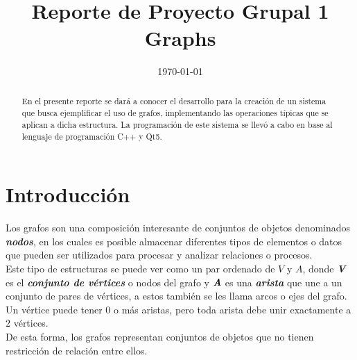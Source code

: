 \documentclass[conference]{IEEEtran}
\date{\specialdate\today}
\begin{document}
\newcommand{\breite}{0.9} %
\newcommand{\RelacionFiguradoscolumnas}{0.9}
\newcommand{\RelacionFiguradoscolumnasPuntoCinco}{0.45}



\title{Reporte de Proyecto Grupal 1 \\Graphs}

\author{
}
\maketitle



\begin{abstract} 
\textbf{} En el presente reporte se dará a conocer el desarrollo para la creación de un sistema que busca ejemplificar el uso de grafos, implementando las operaciones típicas que se aplican a dicha estructura. La programación de este sistema se llevó a cabo en base al lenguaje de programación C++ y Qt5.
\end{abstract}



\section{Introducción}
Los grafos son una composición interesante de conjuntos de objetos denominados \textit{\textbf{nodos}}, en los cuales es posible almacenar diferentes tipos de elementos o datos que pueden ser utilizados para procesar y analizar relaciones o procesos.\\
Este tipo de estructuras se puede ver como un par ordenado de $V$ y $A$, donde \textit{\textbf{V}} es el \textit{\textbf{conjunto de vértices}} o nodos del grafo y $\textit{\textbf{A}}$ es una \textit{\textbf{arista}} que une a un conjunto de pares de vértices, a estos también se les llama arcos o ejes del grafo. Un vértice puede tener $0$ o más aristas, pero toda arista debe unir exactamente a $2$ vértices.\\
De esta forma, los grafos representan conjuntos de objetos que no tienen restricción de relación entre ellos.\cite{Grafos}\cite{Graphs}\cite{V&A}
\end{document}
